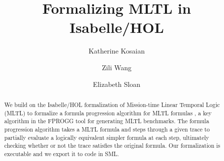 \documentclass[11pt,a4paper]{article}
\begin{document}
\title{Formalizing MLTL in Isabelle/HOL}
\author{Katherine Kosaian \and Zili Wang \and Elizabeth Sloan}
\maketitle

\begin{abstract}
  We build on the Isabelle/HOL formalization of Mission-time Linear Temporal Logic (MLTL) to formalize a formula progression algorithm for MLTL formulas \cite{LR18}, a key algorithm in the FPROGG tool \cite{RR25} for generating MLTL benchmarks.
  The formula progression algorithm takes a MLTL formula and steps through a given trace to partially evaluate a logically equivalent simpler formula at each step, ultimately checking whether or not the trace satisfies the original formula.
  Our formalization is executable and we export it to code in SML.
\end{abstract}

\tableofcontents





\end{document}
